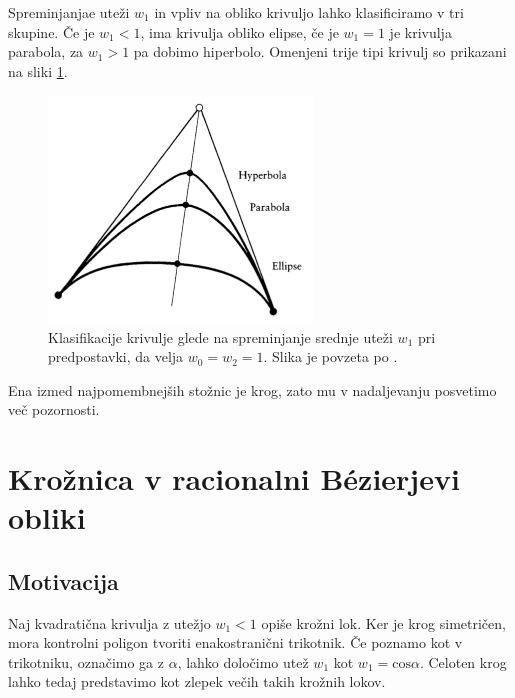 \documentclass[a4paper,11pt]{article}
\theoremstyle{definition}
\theoremstyle{plain}
\begin{document}
\newpage
Spreminjanjae uteži $w_1$ in vpliv na obliko krivuljo lahko klasificiramo v tri skupine. Če je $w_1 < 1$, ima krivulja obliko elipse, če je $w_1 = 1$ je krivulja parabola, za $w_1 > 1$ pa dobimo hiperbolo. Omenjeni trije tipi krivulj so prikazani na sliki \ref{slika:klasifikacija}.

\begin{figure}[ht!]\label{slika:klasifikacija}
    \centering
    \includegraphics[width=70mm]{tri_oblike.png}
    \caption{Klasifikacije krivulje glede na spreminjanje srednje uteži $w_1$ pri predpostavki, da velja $w_0 = w_2 = 1$. Slika je povzeta po \cite{farin}.}
\end{figure}
\noindent
Ena izmed najpomembnejših stožnic je krog, zato mu v nadaljevanju posvetimo več pozornosti.



\section{Krožnica v racionalni B\'ezierjevi obliki}

\subsection{Motivacija}

Naj kvadratična krivulja z utežjo $w_1 < 1$ opiše krožni lok. Ker je krog simetričen, mora kontrolni poligon tvoriti enakostranični trikotnik.
Če poznamo kot v trikotniku, označimo ga z $\alpha$, lahko določimo utež $w_1$ kot $w_1 = \text{cos} \alpha$.
Celoten krog lahko tedaj predstavimo kot zlepek večih takih krožnih lokov. 
\end{document}
